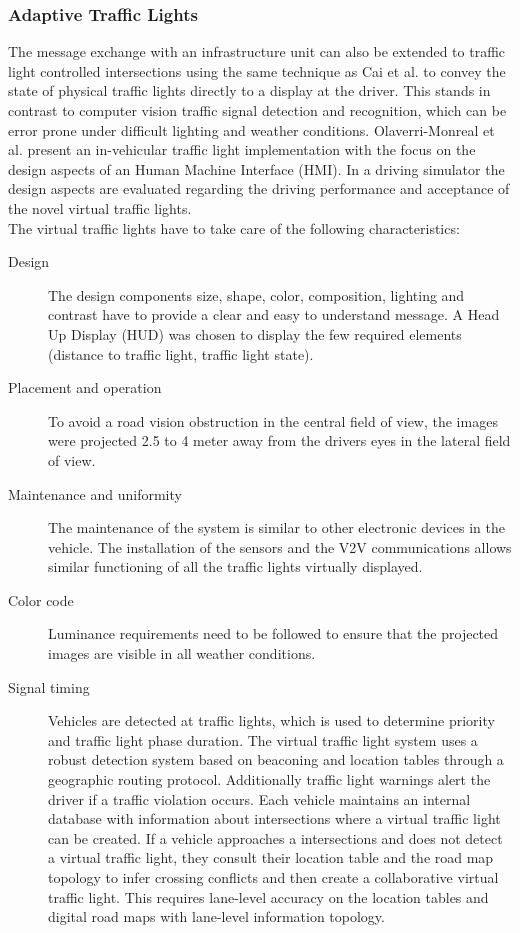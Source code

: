 \documentclass{sig-alternate}
\begin{document}
\subsubsection{Adaptive Traffic Lights}
The message exchange with an infrastructure unit can also be extended to traffic light controlled intersections using the same technique as Cai et al. to convey the state of physical traffic lights directly to a display at the driver. This stands in contrast to computer vision traffic signal detection and recognition, which can be error prone under difficult lighting and weather conditions. Olaverri-Monreal et al.\cite{6263090} present an in-vehicular traffic light implementation with the focus on the design aspects of an Human Machine Interface (HMI). In a driving simulator the design aspects are evaluated regarding the driving performance and acceptance of the novel virtual traffic lights. \\
The virtual traffic lights have to take care of the following characteristics: 
\begin{description}
\item[Design] The design components size, shape, color, composition, lighting and contrast have to provide a clear and easy to understand message. A Head Up Display (HUD) was chosen to display the few required elements (distance to traffic light, traffic light state). 
\item[Placement and operation] To avoid a road vision obstruction in the central field of view, the images were projected 2.5 to 4 meter away from the drivers eyes in the lateral field of view.
\item[Maintenance and uniformity] The maintenance of the system is similar to other electronic devices in the vehicle. The installation of the sensors and the V2V communications allows similar functioning of all the traffic lights virtually displayed. 
\item[Color code] Luminance requirements need to be followed to ensure that the projected images are visible in all weather conditions. 
\item[Signal timing] Vehicles are detected at traffic lights, which is used to determine priority and traffic light phase duration. The virtual traffic light system uses a robust detection system based on beaconing and location tables through a geographic routing protocol. Additionally traffic light warnings alert the driver if a traffic violation occurs. Each vehicle maintains an internal database with information about intersections where a virtual traffic light can be created. If a vehicle approaches a intersections and does not detect a virtual traffic light, they consult their location table and the road map topology to infer crossing conflicts and then create a collaborative virtual traffic light. This requires lane-level accuracy on the location tables and digital road maps with lane-level information topology. 
\end{description}
\end{document}

